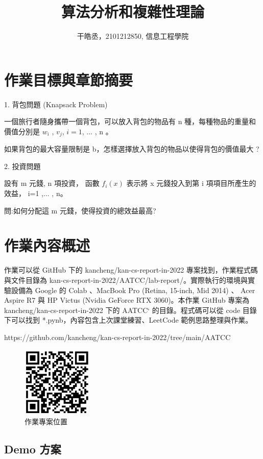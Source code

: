 \documentclass[10pt,UTF8]{ctexart}
\title{算法分析和複雜性理論}
\author{干皓丞，2101212850, 信息工程學院}
\begin{document}
\maketitle


\section{作業目標與章節摘要}

1. 背包問題 (Knapsack Problem)

一個旅行者隨身攜帶一個背包，可以放入背包的物品有 n 種，每種物品的重量和價值分別是 $w_{i}$ , $v_j$, $i = 1$, ... , n 。

如果背包的最大容量限制是 b，怎樣選擇放入背包的物品以使得背包的價值最大 ?

2. 投資問題

設有 m 元錢, n 項投資， 函數 $f_{i}(x)$ 表示將 x 元錢投入到第 i 項項目所產生的效益， i=1 ,... , n。

問:如何分配這 m 元錢，使得投資的總效益最高?



\section{作業內容概述}

作業可以從 GitHub 下的 kancheng/kan-cs-report-in-2022 專案找到，作業程式碼與文件目錄為 kan-cs-report-in-2022/AATCC/lab-report/。實際執行的環境與實驗設備為 Google 的 Colab 、MacBook Pro (Retina, 15-inch, Mid 2014) 、 Acer Aspire R7 與 HP Victus (Nvidia GeForce RTX 3060)。本作業 GitHub 專案為 kancheng/kan-cs-report-in-2022 下的 AATCC` 的目錄。程式碼可以從 code 目錄下可以找到 *.pynb，內容包含上次課堂練習、LeetCode 範例思路整理與作業。

https://github.com/kancheng/kan-cs-report-in-2022/tree/main/AATCC

\begin{figure}[H]
\centering 
\includegraphics[width=0.30\textwidth]{aatccqr.png} 
\caption{作業專案位置}
\label{Test}
\end{figure}

\subsection{Demo 方案}
\end{document}
